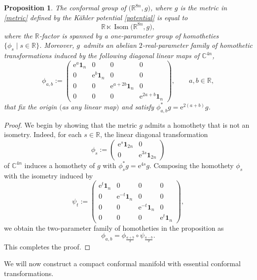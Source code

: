 \documentclass[11pt]{article}
\numberwithin{equation}{section}
\numberwithin{equation}{section}
\newtheorem{Proposition}[Theorem]{Proposition}
 { \theoremstyle{definition}
\newtheorem{Definition}[Theorem]{Definition}
\newtheorem{Note}[Theorem]{Note}
\newtheorem{Example}[Theorem]{Example}
\newtheorem{Remark}[Theorem]{Remark} }
\DeclareMathOperator{\Iso}{\mathrm{Isom}}
\newcommand{\C}{\ensuremath{\mathbb{C}}}
\newcommand{\1}{\mathbf{1}}
\newcommand{\e}{\mathrm{e}}
\newcommand{\+}{\oplus}
\renewcommand{\=}{\equiv}
\newcommand{\R}{\mathbb{R}}
\newcommand{\belabel}[1]{\begin{equation}\label{#1}}
\begin{document}
\begin{Proposition}
The conformal group of $\bigl(\R^{8n},g\bigr)$, where $g$ is the metric in \eqref{metric} defined by the K\"{a}hler potential \eqref{potential} is equal to
\[\R\ltimes \Iso\bigl(\R^{8n},g\bigr),
\]
where the $\R$-factor is spanned by a one-parameter group of homotheties $\{\phi_s\mid s\in \R\}$.
Moreover, $g$~admits an abelian $2$-real-parameter family of homothetic transformations induced by the following diagonal linear maps of $\C^{4n}$,
\belabel{chomoth}\phi_{a,b}:=
\begin{pmatrix} \e^{a}\1_{n} &0&0&0\\ 0& \e^{b} \1_{n}&0&0 \\
0&0& \e^{a+2b} \1_{n}&0\\
0&0&0&\e^{2a+b}\1_{n}
\end{pmatrix},\qquad a,b\in \R,\end{equation}
that fix the origin $($as any linear map$)$ and satisfy $\phi_{a,b}^*g=\e^{2(a+b)}g$.

\end{Proposition}
\begin{proof}
We begin by showing that the metric $g$ admits a homothety that is not an isometry.
Indeed, for each $s\in \R$, the linear diagonal transformation
\[\phi_s:=\begin{pmatrix} \e^{s}\1_{2n} &0\\ 0& \e^{3s}\1_{2n}\end{pmatrix}\]
of $\C^{4n}$ induces a homothety of $g$ with $\phi_s^*g=\e^{4s}g$.
Composing the homothety $\phi_s$ with the isometry induced by
\[\psi_t:=\begin{pmatrix} \e^{t}\1_{n} &0&0&0\\ 0& \e^{-t} \1_{n}&0&0 \\
0&0& \e^{-t} \1_{n}&0\\
0&0&0&\e^{t}\1_{n}
\end{pmatrix},\]
we obtain the {two-parameter} family of homotheties in the proposition as
\[\phi_{a,b}= \phi_{\tfrac{a+b}{2}} \circ \psi_{\tfrac{a-b}{2}}. \]
This completes the proof.
\end{proof}

We will now construct a compact conformal manifold with essential conformal transformations.
\end{document}
